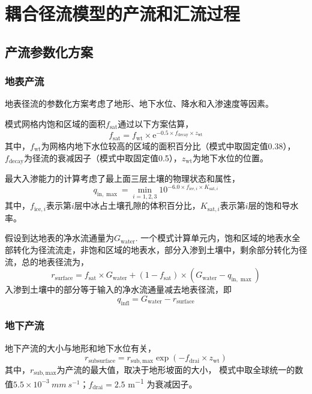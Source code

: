 \chapter{耦合径流模型的产流和汇流过程}

\section{产流参数化方案}

\subsection{地表产流}

地表径流的参数化方案\citep{niu2005simple}考虑了地形、地下水位、降水和入渗速度等因素。

模式网格内饱和区域的面积$f_{\mathrm{sat}}$通过以下方案估算，
\begin{equation}
f_{\mathrm{sat}}=f_{\mathrm{wt}} \times \mathrm{e}^{-0.5 \times f_{\mathrm{decay}} \times z_{\mathrm{wt}}}
\end{equation}
其中，$f_{\mathrm{wt}}$为网格内地下水位较高的区域的面积百分比（模式中取固定值0.38），$f_{\mathrm{decay}}$为径流的衰减因子（模式中取固定值0.5），$z_{\mathrm{wt}}$为地下水位的位置。

最大入渗能力的计算考虑了最上面三层土壤的物理状态和属性，
\begin{equation}
q_{\mathrm{in}, \max }= \min _{i=1,2,3} 10^{-6.0 \times f_{\mathrm{ice}, i} \times K_{\mathrm{sat}, i}}
\end{equation}
其中，$f_{\mathrm{ice},i}$表示第$i$层中冰占土壤孔隙的体积百分比，$K_{\mathrm{sat},i}$表示第$i$层的饱和导水率。

假设到达地表的净水流通量为$G_{\mathrm{water}}$. 一个模式计算单元内，饱和区域的地表水全部转化为径流流走，非饱和区域的地表水，部分入渗到土壤中，剩余部分转化为径流，总的地表径流为，
\begin{equation}
r_{\mathrm{surface}}=f_{\mathrm{sat}} \times G_{\mathrm{water}}+\left(1-f_{\mathrm{sat}}\right) \times \left(G_{\mathrm{water}}-q_{\mathrm{in},\max}\right)
\end{equation}
入渗到土壤中的部分等于输入的净水流通量减去地表径流，即
\begin{equation}
q_{\mathrm{infl}}={G}_{\mathrm{water}}-r_{\mathrm{surface}}
\end{equation}

\subsection{地下产流} \label{section:rsub_par}
地下产流的大小与地形和地下水位有关\citep{niu2005simple}，
\begin{equation}
r_{\mathrm{subsurface}} = r_{\mathrm{sub,max}} \exp \left(-f_{\mathrm{drai}} \times z_{\mathrm{wt}}\right)
\end{equation}
其中，$r_{\mathrm{sub,max}}$为产流的最大值，取决于地形坡面的大小，
模式中取全球统一的数值$5.5\times 10^{-3}~\unit{mm~s^{-1}}$；$f_{\mathrm{drai}}=2.5$ \unit{m^{-1}} 为衰减因子。

